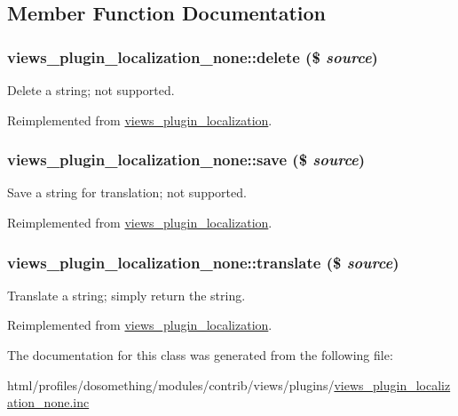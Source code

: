 \subsection{Member Function Documentation}
\hypertarget{classviews__plugin__localization__none_ad92bca64ae753d74f2f61d41e2638625}{
\subsubsection[{delete}]{\setlength{\rightskip}{0pt plus 5cm}views\_\-plugin\_\-localization\_\-none::delete (\$ {\em source})}}
\label{classviews__plugin__localization__none_ad92bca64ae753d74f2f61d41e2638625}
Delete a string; not supported. 

Reimplemented from \hyperlink{classviews__plugin__localization_a52726c9177d4dcf033ac81c8287bb5f6}{views\_\-plugin\_\-localization}.\hypertarget{classviews__plugin__localization__none_a8c0a923ab826b285bea27b9c5097effd}{
\subsubsection[{save}]{\setlength{\rightskip}{0pt plus 5cm}views\_\-plugin\_\-localization\_\-none::save (\$ {\em source})}}
\label{classviews__plugin__localization__none_a8c0a923ab826b285bea27b9c5097effd}
Save a string for translation; not supported. 

Reimplemented from \hyperlink{classviews__plugin__localization_a28f6f39bb83c3379d123e039287f50ed}{views\_\-plugin\_\-localization}.\hypertarget{classviews__plugin__localization__none_a2fcd5143ca56317256a13291e91c6c89}{
\subsubsection[{translate}]{\setlength{\rightskip}{0pt plus 5cm}views\_\-plugin\_\-localization\_\-none::translate (\$ {\em source})}}
\label{classviews__plugin__localization__none_a2fcd5143ca56317256a13291e91c6c89}
Translate a string; simply return the string. 

Reimplemented from \hyperlink{classviews__plugin__localization_a56b08b27d30b9061c3c9a51993fe4159}{views\_\-plugin\_\-localization}.

The documentation for this class was generated from the following file:\begin{DoxyCompactItemize}
\item 
html/profiles/dosomething/modules/contrib/views/plugins/\hyperlink{views__plugin__localization__none_8inc}{views\_\-plugin\_\-localization\_\-none.inc}\end{DoxyCompactItemize}
